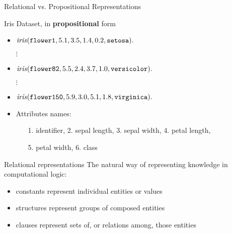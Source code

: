 \documentclass[presentation]{beamer}\mode<presentation>{\usetheme{AMSBolognaFC}}
\begin{document}
\begin{frame}[allowframebreaks]{Relational vs. Propositional Representations}
    \begin{exampleblock}{Iris Dataset, in \textbf{propositional} form}
        \begin{itemize}
            \item $\text{\textit{iris}}(\mathtt{flower1}, 5.1, 3.5, 1.4, 0.2, \mathtt{setosa}) \mathtt{.}$
            \item[$\vdots$]
            \item $\text{\textit{iris}}(\mathtt{flower82}, 5.5, 2.4, 3.7, 1.0, \mathtt{versicolor}) \mathtt{.}$
            \item[$\vdots$]
            \item $\text{\textit{iris}}(\mathtt{flower150}, 5.9, 3.0, 5.1, 1.8,  \mathtt{virginica}) \mathtt{.}$
        \end{itemize}
    \end{exampleblock}
    \begin{itemize}
        \item Attributes names:
        \begin{itemize}
            \item[1.] identifier, \alert{2.} sepal length, \alert{3.} sepal width, \alert{4.} petal length,
            \item[5.] petal width, \alert{6.} class
        \end{itemize}
    \end{itemize}

    \begin{block}{Relational representations}
        The natural way of representing knowledge in computational logic:
        \begin{itemize}
            \item constants represent individual entities or values
            \item structures represent groups of composed entities
            \item clauses represent sets of, or relations among, those entities
        \end{itemize}
    \end{block}


\end{frame}
\end{document}
